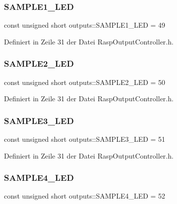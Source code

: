 \subsubsection{\texorpdfstring{S\+A\+M\+P\+L\+E1\+\_\+\+L\+ED}{SAMPLE1\_LED}}
{\footnotesize\ttfamily const unsigned short outputs\+::\+S\+A\+M\+P\+L\+E1\+\_\+\+L\+ED = 49}



Definiert in Zeile 31 der Datei Rasp\+Output\+Controller.\+h.

\mbox{\label{namespaceoutputs_ae0776935fda36be3a645994d16591980}} 
\subsubsection{\texorpdfstring{S\+A\+M\+P\+L\+E2\+\_\+\+L\+ED}{SAMPLE2\_LED}}
{\footnotesize\ttfamily const unsigned short outputs\+::\+S\+A\+M\+P\+L\+E2\+\_\+\+L\+ED = 50}



Definiert in Zeile 31 der Datei Rasp\+Output\+Controller.\+h.

\mbox{\label{namespaceoutputs_a8a0be2be0ae271cb8b57234a189b6689}} 
\subsubsection{\texorpdfstring{S\+A\+M\+P\+L\+E3\+\_\+\+L\+ED}{SAMPLE3\_LED}}
{\footnotesize\ttfamily const unsigned short outputs\+::\+S\+A\+M\+P\+L\+E3\+\_\+\+L\+ED = 51}



Definiert in Zeile 31 der Datei Rasp\+Output\+Controller.\+h.

\mbox{\label{namespaceoutputs_a6fbee7a72f91577a7e1f072d00ad8d9f}} 
\subsubsection{\texorpdfstring{S\+A\+M\+P\+L\+E4\+\_\+\+L\+ED}{SAMPLE4\_LED}}
{\footnotesize\ttfamily const unsigned short outputs\+::\+S\+A\+M\+P\+L\+E4\+\_\+\+L\+ED = 52}



